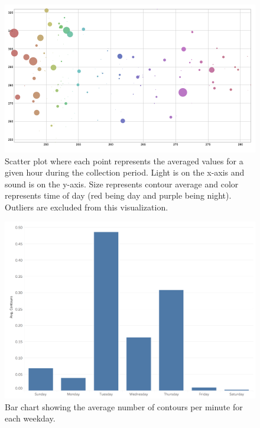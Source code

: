 \begin{figure}[t]
    \centering
    \includegraphics[width=0.97\linewidth]{figs/averages_scatter.png}
    \caption{Scatter plot where each point represents the averaged values for a given hour during the collection period. Light is on the x-axis and sound is on the y-axis. Size represents contour average and color represents time of day (red being day and purple being night). Outliers are excluded from this visualization.}
    \label{fig:scatter}
\end{figure}

\begin{figure}[t]
    \centering
    \includegraphics[width=0.97\linewidth]{figs/bars.png}
    \caption{Bar chart showing the average number of contours per minute for each weekday.}
    \label{fig:bars}
\end{figure}